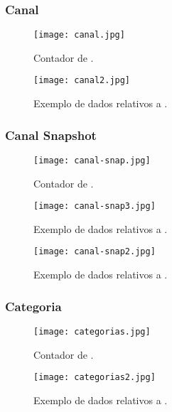 \subsubsection{Canal}

\begin{figure}[H]
  \centering
  \begin{minipage}[b]{0.25\textwidth}
      \centering
      \texttt{[image: canal.jpg]}
      \caption{Contador de .}
  \end{minipage}
  \hspace{0.05\textwidth}
  \begin{minipage}[b]{0.6\textwidth}
      \centering
      \texttt{[image: canal2.jpg]}
      \caption{Exemplo de dados relativos a .}
  \end{minipage}
\end{figure}

\subsubsection{Canal Snapshot}

\begin{figure}[H]
  \centering
  \begin{minipage}[b]{0.25\textwidth}
      \centering
      \texttt{[image: canal-snap.jpg]}
      \caption{Contador de .}
  \end{minipage}
  \hspace{0.05\textwidth}
  \begin{minipage}[b]{0.6\textwidth}
      \centering
      \texttt{[image: canal-snap3.jpg]}
      \caption{Exemplo de dados relativos a .}
  \end{minipage}
\end{figure}

\begin{figure}[H]
  \centering
  \texttt{[image: canal-snap2.jpg]}
  \caption{Exemplo de dados relativos a .}
\end{figure}

\subsubsection{Categoria}

\begin{figure}[H]
  \centering
  \begin{minipage}[b]{0.25\textwidth}
      \centering
      \texttt{[image: categorias.jpg]}
      \caption{Contador de .}
  \end{minipage}
  \hspace{0.05\textwidth}
  \begin{minipage}[b]{0.6\textwidth}
      \centering
      \texttt{[image: categorias2.jpg]}
      \caption{Exemplo de dados relativos a .}
  \end{minipage}
\end{figure}

